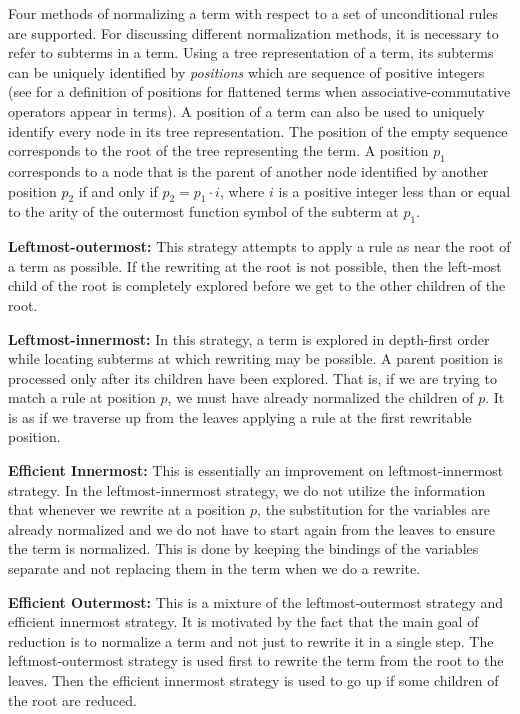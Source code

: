 Four methods of normalizing a term with respect to a set of
unconditional rules are supported.  For discussing different
normalization methods, it is necessary to refer to subterms in
a term.  Using a tree representation of a term, its subterms can be
uniquely identified by {\em positions} which are sequence of positive
integers (see \cite{KMN84} for a definition of positions
for flattened terms when associative-commutative operators appear in
terms). A position of a term can also be used to uniquely identify
every node in its tree representation. 
The position of the empty
sequence corresponds to the root of the tree representing the term.
A position $p_1$ corresponds to
a node that is
the parent of another node identified by
another position $p_2$ if and only if $p_2 = p_1 \cdot i$, where
$i$ is a positive integer less than or equal to the arity of 
the outermost function
symbol of the subterm at $p_1$.
\begin{description} 
\item{\bf Leftmost-outermost:} This strategy
attempts to apply a rule as near the root of a term as possible. If
the rewriting at the root is not possible, then the left-most child of
the root is completely explored before we get to the other children of
the root.  

\item{\bf Leftmost-innermost:} In this strategy, a term is
explored in depth-first order while locating subterms at which
rewriting may be possible. A parent position
is processed only after its children have been explored. That is, if
we are trying to match a rule at position $p$, we must have already
normalized the children of $p$. It is as if we traverse up from the
leaves applying a rule at the first rewritable position. 

\item{\bf Efficient Innermost:} This is essentially an improvement on
leftmost-innermost strategy.  In the leftmost-innermost strategy, we
do not utilize the information that whenever we rewrite at a position
$p$, the substitution for the variables are already normalized and we do
not have to start again from the leaves to ensure the term is
normalized. This is done by keeping the bindings of the variables
separate and not replacing them in the term when we do a rewrite.

\item{\bf Efficient Outermost:} This is
a mixture of the leftmost-outermost strategy and efficient innermost
strategy. It is motivated by the fact that the main goal of
reduction is to normalize
a term and not just to rewrite it in a single step.
The leftmost-outermost strategy is used first to rewrite the
term from the root to the leaves. Then the efficient innermost
strategy is used to go up if some children of the root are reduced.
\end{description}

